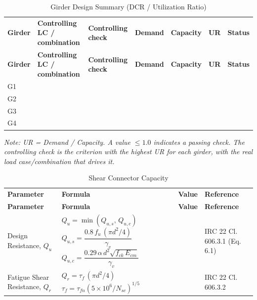 \documentclass[12pt,a4paper]{report}
\numberwithin{figure}{chapter}
\begin{document}
\vspace{1em}
\vspace{0.4em}
\begin{longtable}{|C{1.38cm}|C{2.42cm}|C{2.48cm}|C{1.71cm}|C{1.71cm}|C{1.05cm}|C{1.6cm}|}
\caption{Girder Design Summary (DCR / Utilization Ratio)}\\
\hline
\textbf{Girder} & \textbf{Controlling LC / combination} & \textbf{Controlling check} & \textbf{Demand} & \textbf{Capacity} & \textbf{UR} & \textbf{Status} \\
\hline
\endfirsthead
\hline
\textbf{Girder} & \textbf{Controlling LC / combination} & \textbf{Controlling check} & \textbf{Demand} & \textbf{Capacity} & \textbf{UR} & \textbf{Status} \\
\hline
\endhead
G1 &  &  &  &  &  &  \\
\hline
G2 &  &  &  &  &  &  \\
\hline
G3 &  &  &  &  &  &  \\
\hline
G4 &  &  &  &  &  &  \\
\hline
\end{longtable}
\noindent\textit{Note: UR = Demand / Capacity. A value $\leq 1.0$ indicates a passing check. The controlling check is the criterion with the highest UR for each girder, with the real load case/combination that drives it.}

\vspace{1em}

\begin{longtable}{|L{3.48cm}|C{4.54cm}|C{2.54cm}|L{3.12cm}|}
\caption{Shear Connector Capacity}\\
\hline
\textbf{Parameter} & \textbf{Formula} & \textbf{Value} & \textbf{Reference} \\
\hline
\endfirsthead
\hline
\textbf{Parameter} & \textbf{Formula} & \textbf{Value} & \textbf{Reference} \\
\hline
\endhead
Design Resistance, $Q_u$ & \footnotesize{} &  & IRC 22 Cl. 606.3.1 (Eq. 6.1) \\
\hline
Fatigue Shear Resistance, $Q_r$ & \footnotesize{} &  & IRC 22 Cl. 606.3.2 \\
\hline
\end{longtable}
\end{document}
